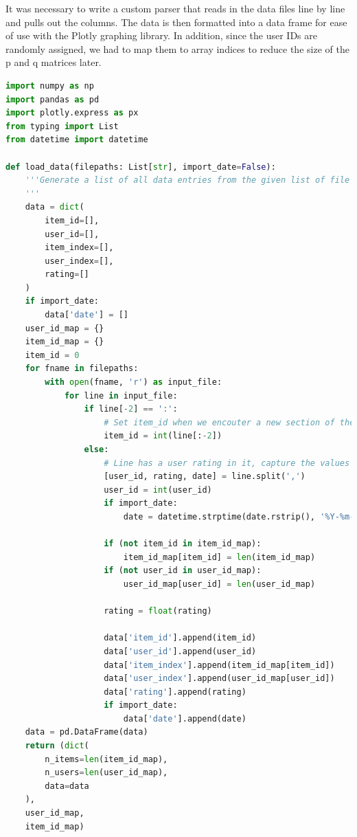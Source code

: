 \documentclass[11pt,a4paper]{article}
\begin{document}
It was necessary to write a custom parser that reads in the data files line by line and pulls out the columns. The data is then formatted into a data frame for ease of use with the Plotly graphing library. In addition, since the user IDs are randomly assigned, we had to map them to array indices to reduce the size of the p and q matrices later.
\newpage
\begin{lstlisting}[language=Python]
import numpy as np
import pandas as pd
import plotly.express as px
from typing import List
from datetime import datetime

def load_data(filepaths: List[str], import_date=False):
    '''Generate a list of all data entries from the given list of file paths
    '''
    data = dict(
        item_id=[],
        user_id=[],
        item_index=[],
        user_index=[],
        rating=[]
    )
    if import_date:
        data['date'] = []
    user_id_map = {}
    item_id_map = {}
    item_id = 0
    for fname in filepaths:
        with open(fname, 'r') as input_file:
            for line in input_file:
                if line[-2] == ':':
                    # Set item_id when we encouter a new section of the data
                    item_id = int(line[:-2])
                else:
                    # Line has a user rating in it, capture the values and store in array
                    [user_id, rating, date] = line.split(',')
                    user_id = int(user_id)
                    if import_date:
                        date = datetime.strptime(date.rstrip(), '%Y-%m-%d')

                    if (not item_id in item_id_map):
                        item_id_map[item_id] = len(item_id_map)
                    if (not user_id in user_id_map):
                        user_id_map[user_id] = len(user_id_map)

                    rating = float(rating)

                    data['item_id'].append(item_id)
                    data['user_id'].append(user_id)
                    data['item_index'].append(item_id_map[item_id])
                    data['user_index'].append(user_id_map[user_id])
                    data['rating'].append(rating)
                    if import_date:
                        data['date'].append(date)
    data = pd.DataFrame(data)
    return (dict(
        n_items=len(item_id_map),
        n_users=len(user_id_map),
        data=data
    ),
    user_id_map,
    item_id_map)
\end{lstlisting}
\end{document}
